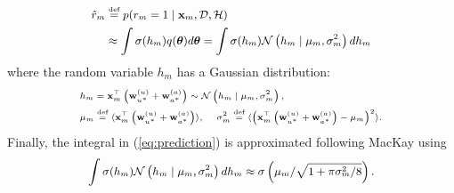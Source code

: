 \begin{equation}
\begingroup\makeatletter\def\f@size{\fsize}\check@mathfonts
\def\maketag@@@#1{\hbox{\m@th\large\normalfont#1}}%
\begin{aligned}
\hat{r}_m & \defined p(r_m=1 \mid \x_m,\mathcal{D},  \mathcal{H}) \\
& \approx \int \sigma(h_m)q(\btheta)d \btheta  
 = \int \sigma(h_m) \mathcal{N} \left(h_m \mid \mu_m, \sigma_m^2 \right) d h_m
\label{eq:prediction}
\end{aligned}\endgroup
\end{equation}
where the random variable $h_m$ has a Gaussian distribution: %
\begin{equation}
\begingroup\makeatletter\def\f@size{7}\check@mathfonts
\def\maketag@@@#1{\hbox{\m@th\large\normalfont#1}}%
\begin{aligned}
& h_m=\x_m^\top \left(\w_{u^*}^{(u)}+\w_{a^*}^{(a)} \right) \sim \mathcal{N} \left(h_m \mid \mu_m, \sigma_m^2 \right), \\
& \mu_m \defined \langle \x_m^\top \left(\w_{u^*}^{(u)}+\w_{a^*}^{(a)} \right) \rangle,
 \quad \sigma_m^2 \defined \langle \left( \x_m^\top \left(\w_{u^*}^{(u)}+\w_{a^*}^{(a)} \right) - \mu_m \right)^2 \rangle. \nonumber
\end{aligned}\endgroup
\end{equation}
Finally, the integral in (\ref{eq:prediction}) is approximated following MacKay \cite{MacKay92} using
\begin{equation}
\begingroup\makeatletter\def\f@size{\fsize}\check@mathfonts
\def\maketag@@@#1{\hbox{\m@th\large\normalfont#1}}%
\begin{aligned}
\int \sigma(h_m) \mathcal{N} \left(h_m \mid \mu_m, \sigma_m^2 \right) d h_m \approx \sigma \left( \mu_m / \sqrt{1+\pi\sigma_m^2/8}\right).
\end{aligned}\endgroup
\label{eq:PredictionApproximation}
\end{equation}

